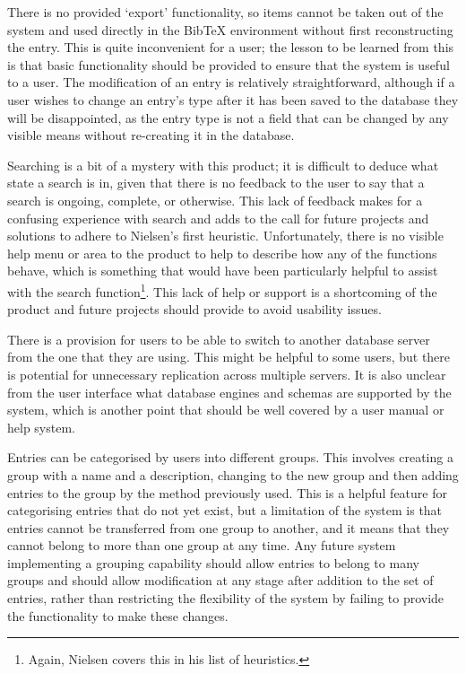 \documentclass{l4proj}
\newcommand{\BibTeX}{B{\sc ib}\TeX}
\newcommand{\bibtex}{\BibTeX}
\begin{document}
There is no provided `export' functionality, so items cannot be taken out of the system and used directly in the \bibtex{} environment without first reconstructing the entry.  This is quite inconvenient for a user; the lesson to be learned from this is that basic functionality should be provided to ensure that the system is useful to a user.
The modification of an entry is relatively straightforward, although if a user wishes to change an entry's type after it has been saved to the database they will be disappointed, as the entry type is not a field that can be changed by any visible means without re-creating it in the database.

Searching is a bit of a mystery with this product; it is difficult to deduce what state a search is in, given that there is no feedback to the user to say that a search is ongoing, complete, or otherwise.  This lack of feedback makes  for a confusing experience with search and adds to the call for future projects and solutions to adhere to Nielsen's first heuristic. Unfortunately, there is no visible help menu or area to the product to help to describe how any of the functions behave, which is something that would have been particularly helpful to assist with the search function\footnote{Again, Nielsen covers this in his list of heuristics.}.  This lack of help or support is a shortcoming of the product and future projects should provide to avoid usability issues.

There is a provision for users to be able to switch to another database server from the one that they are using.  This might be helpful to some users, but there is potential for unnecessary replication across multiple servers.  It is also unclear from the user interface what database engines and schemas are supported by the system, which is another point that should be well covered by a user manual or help system.

Entries can be categorised by users into different groups.  This involves creating a group with a name and a description, changing to the new group and then adding entries to the group by the method previously used.  This is a helpful feature for categorising entries that do not yet exist, but a limitation of the system is that entries cannot be transferred from one group to another, and it means that they cannot belong to more than one group at any time.  Any future system implementing a grouping capability should allow entries to belong to many groups and should allow modification at any stage after addition to the set of entries, rather than restricting the flexibility of the system by failing to provide the functionality to make these changes.
\end{document}
